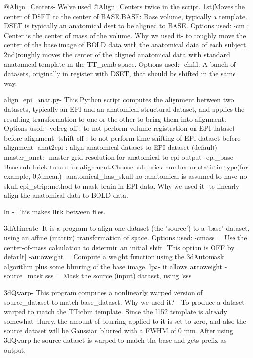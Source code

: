 \documentclass{article}
\begin{document}
@Align\_Centers- We've used @Align\_Centers twice in the script.
1st)Moves the center of DSET to the center of BASE.BASE: Base volume,
typically a template. DSET is typically an anatomical dset to be
aligned to BASE. Options used: -cm : Center is the center of mass of
the volume. Why we used it- to roughly move the center of the base
image of BOLD data with the anatomical data of each subject.
2nd)roughly moves the center of the aligned anatomical data with
standard anatomical template in the TT\_icmb space. Options used:
-child: A bunch of datasets, originally in register with DSET, that
should be shifted in the same way.

align\_epi\_anat.py- This Python script computes the alignment between
two datasets, typically an EPI and an anatomical structural dataset,
and applies the resulting transformation to one or the other to bring
them into alignment. Options used: -volreg off : to not perform
volume registration on EPI dataset before alignment -tshift off : to
not perform time shifting of EPI dataset before alignment -anat2epi :
align anatomical dataset to EPI dataset (default) master\_anat:
-master grid resolution for anatomical to epi output -epi\_base: Base
sub-brick to use for alignment.Choose sub-brick number or statistic
type(for example, 0,5,mean) -anatomical\_has\_skull no :anatomical is
assumed to have no skull epi\_strip:method to mask brain in EPI data.
Why we used it- to linearly align the anatomical data to BOLD data.

ln - This makes link between files.

3dAllineate- It is a program to align one dataset (the 'source') to a
'base' dataset, using an affine (matrix) transformation of space.
Options used: -cmass = Use the center-of-mass calculation to determin
an initial shift [This option is OFF by default] -autoweight = Compute
a weight function using the 3dAutomask algorithm plus some blurring of
the base image. lpa- it allows autoweight -source\_mask sss = Mask
the source (input) dataset, using 'sss


3dQwarp- This program computes a nonlinearly warped version of
source\_dataset to match base\_dataset. Why we used it? - To produce
a dataset warped to match the TTicbm template. Since the I152 template
is already somewhat blurry, the amount of blurring applied to it is
set to zero, and also the source dataset will be Gaussian blurred with
a FWHM of 0 mm. After using 3dQwarp he source dataset is warped to
match the base and gets prefix as output.
\end{document}
